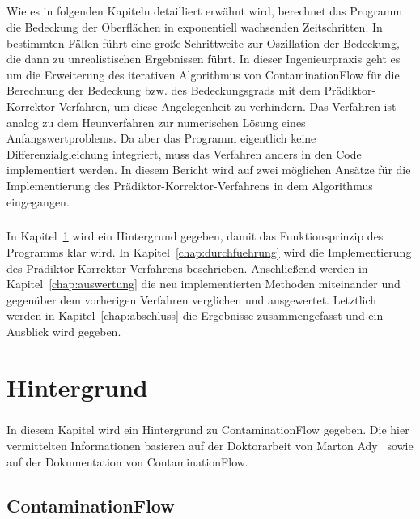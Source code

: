 \documentclass{listhesis}
\begin{document}
\paragraph{}
Wie es in folgenden Kapiteln detailliert erwähnt wird, berechnet das Programm die Bedeckung der Oberflächen in exponentiell wachsenden Zeitschritten. In bestimmten Fällen führt eine große Schrittweite zur Oszillation der Bedeckung, die dann zu unrealistischen Ergebnissen führt. In dieser Ingenieurpraxis geht es um die Erweiterung des iterativen Algorithmus von ContaminationFlow für die Berechnung der Bedeckung bzw. des Bedeckungsgrads mit dem Prädiktor-Korrektor-Verfahren, um diese Angelegenheit zu verhindern. Das Verfahren ist analog zu dem Heunverfahren zur numerischen Lösung eines Anfangswertproblems. Da aber das Programm eigentlich keine Differenzialgleichung integriert, muss das Verfahren anders in den Code implementiert werden. In diesem Bericht wird auf zwei möglichen Ansätze für die Implementierung des Prädiktor-Korrektor-Verfahrens in dem Algorithmus eingegangen. 
\paragraph{}
In Kapitel~\ref{chap:hintergrund} wird ein Hintergrund gegeben, damit das Funktionsprinzip des Programms klar wird. In Kapitel~\ref{chap:durchfuehrung} wird die Implementierung des Prädiktor-Korrektor-Verfahrens beschrieben. Anschließend werden in Kapitel~\ref{chap:auswertung} die neu implementierten Methoden miteinander und gegenüber dem vorherigen Verfahren verglichen und ausgewertet. Letztlich werden in Kapitel~\ref{chap:abschluss} die Ergebnisse zusammengefasst und ein Ausblick wird gegeben.

\chapter{Hintergrund} \label{chap:hintergrund}
\paragraph{}
In diesem Kapitel wird ein Hintergrund zu ContaminationFlow gegeben. Die hier vermittelten Informationen basieren auf der Doktorarbeit von Marton Ady~\cite{marton} sowie auf der Dokumentation von ContaminationFlow.

\section{ContaminationFlow} \label{section:contaminationflow}
\end{document}
